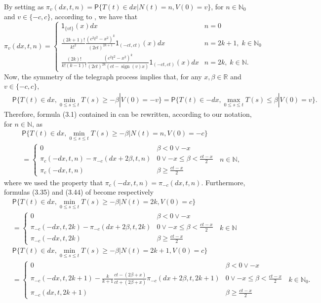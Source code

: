 \documentclass{article}
\DeclareMathOperator{\sign}{sign}
\theoremstyle{definition}
\numberwithin{equation}{section}
\begin{document}
By setting as $\pi_v(dx,t,n) = \mathsf{P}\{T(t) \in dx|N(t) = n,V(0) = v\}$, for $n \in \mathbb{N}_0$ and $v \in \{-c,c\}$, according to \cite{CO 2021}, we have that
\begin{equation}
\pi_v(dx,t,n) =  
\begin{cases}\label{Telegraph conditioned even}
\mathsf{1}_{\{vt\}}(x)dx & n=0 \\
\frac{(2k+1)!}{k!^2}\frac{(c^2t^2-x^2)^{k}}{(2ct)^{2k+1}}\mathsf{1}_{(-ct,ct)}(x)dx &n = 2k+1,\;k \in \mathbb{N}_0\\
\frac{(2k)!}{k!(k-1)!}\frac{(c^2t^2-x^2)^{k}}{(2ct)^{2k}(ct-\sign(v)x)}\mathsf{1}_{(-ct,ct)}(x)dx &n = 2k,\;k \in \mathbb{N}.
\end{cases}
\end{equation}
Now, the symmetry of the telegraph process implies that, for any $x,\beta \in \mathbb{R}$ and $v \in \{-c,c\}$,
\begin{align}\label{symmetry property}
&\mathsf{P}\{T(t) \in dx,\min_{0\leq s \leq t}T(s) \geq -\beta |V(0) = -v\} =\mathsf{P}\{T(t) \in -dx,\max_{0\leq s \leq t}T(s) \leq \beta |V(0) = v\}. 
\end{align}
Therefore, formula (3.1) contained in \cite{C 2023} can be rewritten, according to our notation, for $n \in \mathbb{N}$, as
\begin{align}
&\mathsf{P}\{T(t) \in dx,\min_{0\leq s \leq t}T(s)\geq -\beta|N(t) = n,V(0) = -c\} \nonumber\\&=\begin{cases}\label{joint neg vel}
0 &\beta <0\lor -x\\
\pi_{c}(-dx,t,n)-\pi_{-c}(dx+2\beta,t,n)& 0\lor -x\leq \beta <\frac{ct-x}{2}\\
\pi_{c}(-dx,t,n) & \beta \geq \frac{ct-x}{2}
\end{cases} \;\; n \in \mathbb{N},
\end{align}
where we used the property that $\pi_c(-dx,t,n) = \pi_{-c}(dx,t,n)$. Furthermore, formulas (3.35) and (3.44) of \cite{C 2020} become respectively
\begin{align}
&\mathsf{P}\{T(t) \in dx,\min_{0\leq s \leq t}T(s)\geq -\beta|N(t) = 2k,V(0) = c\} \nonumber\\
&=\begin{cases}
0 & \beta<0\lor -x\\
\pi_{-c}(-dx,t,2k)-\pi_{-c}(dx+2\beta ,t,2k)& 0\lor -x\leq \beta <\frac{ct-x}{2}\\
\pi_{-c}(-dx,t,2k) & \beta \geq \frac{ct-x}{2}
\end{cases} \;\; k \in \mathbb{N}\label{joint pos vel 1}\\
&\mathsf{P}\{T(t) \in dx,\min_{0\leq s \leq t}T(s)\geq -\beta|N(t) = 2k+1,V(0) = c\} \nonumber\\
&=\begin{cases}
0 & \beta<0\lor -x\\
\pi_{-c}(-dx,t,2k+1)-\frac{k}{k+1}\frac{ct-(2\beta+x)}{ct+(2\beta+x)}\pi_{-c}(dx+2\beta,t,2k+1)& 0\lor -x\leq \beta <\frac{ct-x}{2}\\
\pi_{-c}(dx,t,2k+1) & \beta \geq \frac{ct-x}{2}
\end{cases} \;\; k \in \mathbb{N}_0.\label{joint pos vel 2}
\end{align}
\end{document}
